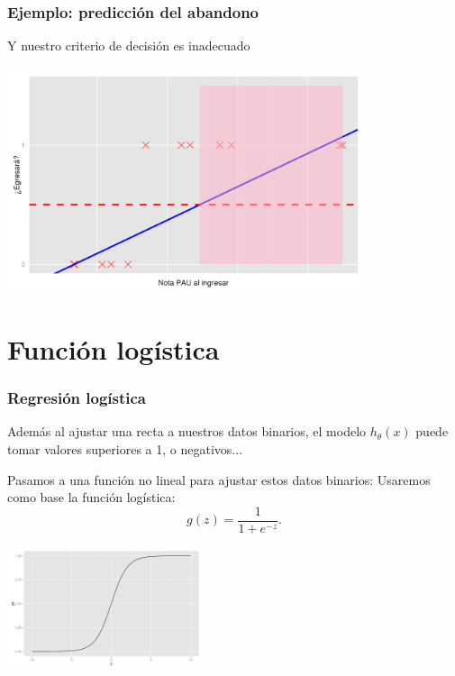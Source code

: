 \documentclass{beamer}
\begin{document}
 \begin{frame}\frametitle{Ejemplo: predicción del abandono}
   \begin{overlayarea}{\textwidth}{0.6cm} 
   Y nuestro criterio de decisión es inadecuado
   \end{overlayarea}
   \begin{center}
  \includegraphics[height=6.6cm]{egresara12.png}
\end{center}

 \end{frame}
    \section{Función logística}
 \begin{frame}\frametitle{Regresión logística}
   \begin{overlayarea}{\textwidth}{\textheight}  
   Además al ajustar una recta a nuestros datos binarios, el modelo $h_\theta(x)$ puede tomar valores superiores a 1, o negativos...
   \begin{block}{Pasamos a una función no lineal para ajustar estos datos binarios:}
     Usaremos como base la función logística:
     $$g(z)=\frac 1 {1+e^{-z}}.$$\vspace{-0.5cm}
     \begin{center}
  \includegraphics[height=3.6cm]{sigmoid.png}
\end{center}
   \end{block}
   \end{overlayarea}
   \end{frame}
\end{document}
